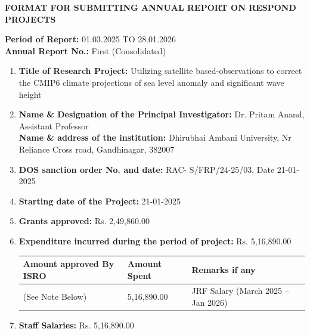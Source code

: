 \documentclass[11pt,a4paper]{article}
\begin{document}
\begin{center}
    \textbf{\Large FORMAT FOR SUBMITTING ANNUAL REPORT ON RESPOND PROJECTS}
\end{center}

\vspace{1em}

\noindent \textbf{Period of Report:} 01.03.2025 TO 28.01.2026 \\
\textbf{Annual Report No.:} First (Consolidated)

\begin{enumerate}[label=\textbf{\arabic*.}]
    \item \textbf{Title of Research Project:} Utilizing satellite based-observations to correct the CMIP6 climate projections of sea level anomaly and significant wave height

    \item \textbf{Name \& Designation of the Principal Investigator:} Dr. Pritam Anand, Assistant Professor \\
    \textbf{Name \& address of the institution:} Dhirubhai Ambani University, Nr Reliance Cross road, Gandhinagar, 382007

    \item \textbf{DOS sanction order No. and date:} RAC- S/FRP/24-25/03, Date 21-01-2025

    \item \textbf{Starting date of the Project:} 21-01-2025

    \item \textbf{Grants approved:} Rs. 2,49,860.00

    \item \textbf{Expenditure incurred during the period of project:} Rs. 5,16,890.00

    \begin{table}[h!]
        \centering
        \begin{tabular}{|p{}|p{}|p{}|}
            \hline
            \textbf{Amount approved By ISRO} & \textbf{Amount Spent} & \textbf{Remarks if any} \\
            \hline
            (See Note Below) & 5,16,890.00 & JRF Salary (March 2025 -- Jan 2026) \\
            \hline
        \end{tabular}
    \end{table}

    \item \textbf{Staff Salaries:} Rs. 5,16,890.00


\end{enumerate}
\end{document}
